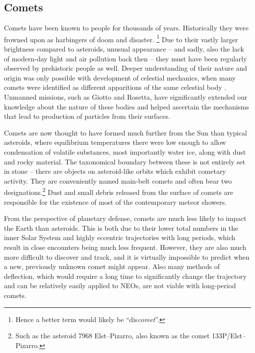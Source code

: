     \subsection{Comets} \label{iac}
        Comets have been known to people for thousands of years. Historically they were
        frowned upon as harbingers of doom and disaster.%
        \footnote{Hence a better term would likely be ``dis\textit{comet}''.}
        Due to their vastly larger brightness compared to asteroids, unusual appearance -- and sadly, also the
        lack of modern-day light and air pollution back then -- they must have been regularly observed by prehistoric people as well.
        Deeper understanding of their nature and origin was only possible with development of celestial mechanics,
        when many comets were identified as different apparitions of the same celestial body \citep{nasa-halley}.
        Unmanned missions, such as Giotto and Rosetta, have significantly extended our knowledge
        about the nature of these bodies and helped ascertain the mechanisms that lead to production of particles from their surfaces.

        Comets are now thought to have formed much further from the Sun than typical asteroids,
        where equilibrium temperatures there were low enough to allow condensation of volatile substances,
        most importantly water ice, along with dust and rocky material.
        The taxonomical boundary between these is not entirely set in stone -- there
        are objects on asteroid-like orbits which exhibit cometary activity.
        They are conveniently named main-belt comets and often bear two
        designations.\footnote{Such as the asteroid 7968 Elst--Pizarro, also known as the comet 133P/Elst--Pizarro.}
        Dust and small debris released from the surface of comets are responsible
        for the existence of most of the contemporary meteor showers.

        From the perspective of planetary defense, comets are much less likely to impact the Earth
        than asteroids. This is both due to their lower total numbers in the inner Solar System
        and highly eccentric trajectories with long periods, which result in close encounters being much less frequent.
        However, they are also much more difficult to discover and track, and it is virtually impossible
        to predict when a new, previously unknown comet might appear.
        Also many methods of deflection, which would require a long time to significantly change the trajectory and
        can be relatively easily applied to NEOs, are not viable with long-period comets.

